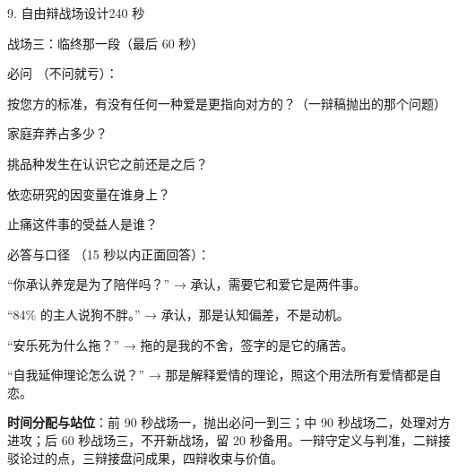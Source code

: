 \documentclass[script,pro]{debate}
\begin{document}
\begin{stage}{9. 自由辩战场设计}{240 秒}
\begin{battleground}{战场三：临终那一段（最后 60 秒）}
\begin{bullets}
\end{bullets}
\begin{points}{必问 （不问就亏）：}
\item 按您方的标准，有没有任何一种爱是更指向对方的？（一辩稿抛出的那个问题）
\item 家庭弃养占多少？
\item 挑品种发生在认识它之前还是之后？
\item 依恋研究的因变量在谁身上？
\item 止痛这件事的受益人是谁？
\end{points}
\begin{points}{必答与口径 （15 秒以内正面回答）：}
\item “你承认养宠是为了陪伴吗？” → 承认，需要它和爱它是两件事。
\item “84\% 的主人说狗不胖。” → 承认，那是认知偏差，不是动机。
\item “安乐死为什么拖？” → 拖的是我的不舍，签字的是它的痛苦。
\item “自我延伸理论怎么说？” → 那是解释爱情的理论，照这个用法所有爱情都是自恋。
\end{points}
\textbf{时间分配与站位}：前 90 秒战场一，抛出必问一到三；中 90 秒战场二，处理对方进攻；后 60 秒战场三，不开新战场，留 20 秒备用。一辩守定义与判准，二辩接驳论过的点，三辩接盘问成果，四辩收束与价值。

\end{battleground}
\end{stage}
\end{document}
